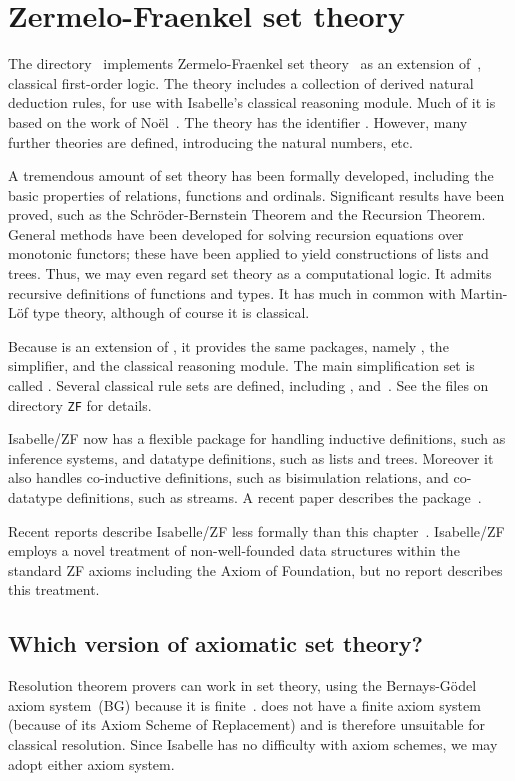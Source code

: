 \chapter{Zermelo-Fraenkel set theory}
The directory~ implements Zermelo-Fraenkel set
theory~\cite{halmos60,suppes72} as an extension of~, classical
first-order logic.  The theory includes a collection of derived natural
deduction rules, for use with Isabelle's classical reasoning module.  Much
of it is based on the work of No\"el~\cite{noel}.  The theory has the {\ML}
identifier .  However, many further theories
are defined, introducing the natural numbers, etc.

A tremendous amount of set theory has been formally developed, including
the basic properties of relations, functions and ordinals.  Significant
results have been proved, such as the Schr\"oder-Bernstein Theorem and the
Recursion Theorem.  General methods have been developed for solving
recursion equations over monotonic functors; these have been applied to
yield constructions of lists and trees.  Thus, we may even regard set
theory as a computational logic.  It admits recursive definitions of
functions and types.  It has much in common with Martin-L\"of type theory,
although of course it is classical.

Because {\ZF} is an extension of {\FOL}, it provides the same packages,
namely , the simplifier, and the classical reasoning
module.  The main simplification set is called .
Several classical rule sets are defined, including ,
 and~.  See the files on directory
{\tt ZF} for details.

Isabelle/ZF now has a flexible package for handling inductive definitions,
such as inference systems, and datatype definitions, such as lists and
trees.  Moreover it also handles co-inductive definitions, such as
bisimulation relations, and co-datatype definitions, such as streams.  A
recent paper describes the package~\cite{paulson-fixedpt}.  

Recent reports describe Isabelle/ZF less formally than this
chapter~\cite{paulson-set-I,paulson-set-II}.  Isabelle/ZF employs a novel
treatment of non-well-founded data structures within the standard ZF axioms
including the Axiom of Foundation, but no report describes this treatment.


\section{Which version of axiomatic set theory?}
Resolution theorem provers can work in set theory, using the
Bernays-G\"odel axiom system~(BG) because it is
finite~\cite{boyer86,quaife92}.  {\ZF} does not have a finite axiom system
(because of its Axiom Scheme of Replacement) and is therefore unsuitable
for classical resolution.  Since Isabelle has no difficulty with axiom
schemes, we may adopt either axiom system.


